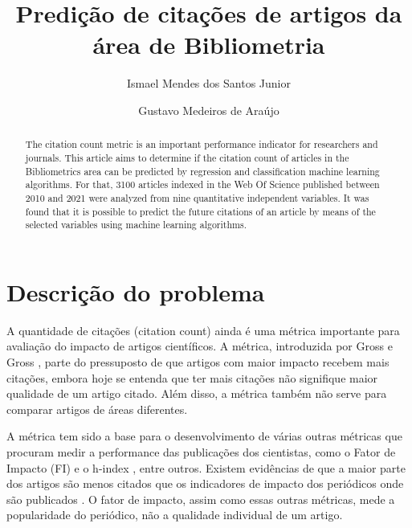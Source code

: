 \documentclass[runningheads]{llncs}
\begin{document}
\title{Predição de citações de artigos da área de Bibliometria}
\author{Ismael Mendes dos Santos Junior \and
Gustavo Medeiros de Araújo}


\maketitle              %

\begin{abstract}
The citation count metric is an important performance indicator for researchers and journals. This article aims to determine if the citation count of articles in the Bibliometrics area can be predicted by regression and classification machine learning algorithms. For that, 3100 articles indexed in the Web Of Science published between 2010 and 2021 were analyzed from nine quantitative independent variables. It was found that it is possible to predict the future citations of an article by means of the selected variables using machine learning algorithms.

\end{abstract}

\section{Descrição do problema}

A quantidade de citações (citation count) ainda é uma métrica importante para avaliação do impacto de artigos científicos. A métrica, introduzida por Gross e Gross \cite{GrossGross1927}, parte do pressuposto de que artigos com maior impacto recebem mais citações, embora hoje se entenda que ter mais citações não signifique maior qualidade de um artigo citado. Além disso, a métrica também não serve para comparar artigos de áreas diferentes.

A métrica tem sido a base para o desenvolvimento de várias outras métricas que procuram medir a performance das publicações dos cientistas, como o Fator de Impacto (FI) \cite{Garfield2006} e o h-index \cite{Hirsch2005}, entre outros. Existem evidências de que a maior parte dos artigos são menos citados que os indicadores de impacto dos periódicos onde são publicados \cite{Bozzo2017}. O fator de impacto, assim como essas outras métricas, mede a popularidade do periódico, não a qualidade individual de um artigo.
\end{document}
